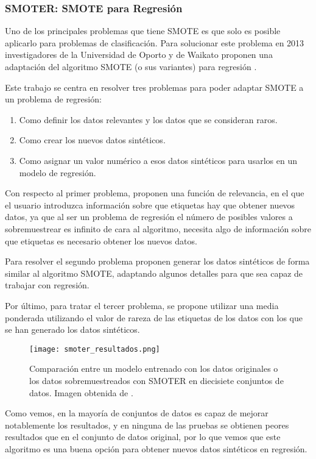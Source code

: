 \subsubsection{SMOTER: SMOTE para Regresión}

Uno de los principales problemas que tiene SMOTE es que solo es posible aplicarlo para problemas de clasificación. Para solucionar este problema en 2013 investigadores de la Universidad de Oporto y de Waikato proponen una adaptación del algoritmo SMOTE (o sus variantes) para regresión \cite{SMOTER}.

Este trabajo se centra en resolver tres problemas para poder adaptar SMOTE a un problema de regresión:

\begin{enumerate}
	\item Como definir los datos relevantes y los datos que se consideran raros.
	\item Como crear los nuevos datos sintéticos.
	\item Como asignar un valor numérico a esos datos sintéticos para usarlos en un modelo de regresión.
\end{enumerate}

Con respecto al primer problema, proponen una función de relevancia, en el que el usuario introduzca información sobre que etiquetas hay que obtener nuevos datos, ya que al ser un problema de regresión el número de posibles valores a sobremuestrear es infinito de cara al algoritmo, necesita algo de información sobre que etiquetas es necesario obtener los nuevos datos.

Para resolver el segundo problema proponen generar los datos sintéticos de forma similar al algoritmo SMOTE, adaptando algunos detalles para que sea capaz de trabajar con regresión.

Por último, para tratar el tercer problema, se propone utilizar una media ponderada utilizando el valor de rareza de las etiquetas de los datos con los que se han generado los datos sintéticos.

\begin{figure}[H]
	\centering
	\texttt{[image: smoter\_resultados.png]}
	\caption{Comparación entre un modelo entrenado con los datos originales o los datos sobremuestreados con SMOTER en diecisiete conjuntos de datos. Imagen obtenida de \cite{SMOTER}.}
	\label{fig:smoter_resultados}
\end{figure}

Como vemos, en la mayoría de conjuntos de datos es capaz de mejorar notablemente los resultados, y en ninguna de las pruebas se obtienen peores resultados que en el conjunto de datos original, por lo que vemos que este algoritmo es una buena opción para obtener nuevos datos sintéticos en regresión.

